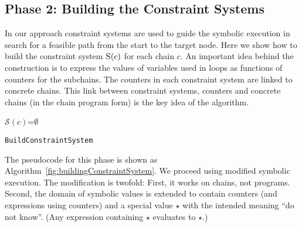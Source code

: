 \documentclass{llncs}
\begin{document}
\subsection{Phase 2: Building the Constraint Systems}
\label{sec:AlgConstraints}

In our approach constraint systems are used to guide the symbolic execution in search for a
feasible path from the start to the target node.  Here we show how to build
the constraint system $\textsc{S}(c)$ for each chain $c$. An important idea
behind the construction is to express the values of variables used in loops
as functions of counters for the subchains. The counters in each
constraint system are linked to concrete chains. This link between
constraint systems, counters and concrete chains (in the chain program form)
is the key idea of the algorithm.

\begin{algorithm}
\dontprintsemicolon
{}
  $\mathcal{S}(c)$=$\emptyset$ \;
  \;
  \;
  \BlankLine 
 \caption{\texttt{BuildConstraintSystem}}
  \label{fig:buildingConstraintSystem}  
\end{algorithm}

The pseudocode for this phase is shown as
Algorithm~\ref{fig:buildingConstraintSystem}. We proceed using modified
symbolic execution. The modification is twofold: First, it works on
chains, not programs. Second, the domain of symbolic values is extended to contain
counters (and expressions using counters) and a special value $\star$ with
the intended meaning ``do not know''. (Any expression containing $\star$
evaluates to $\star$.)
\end{document}
